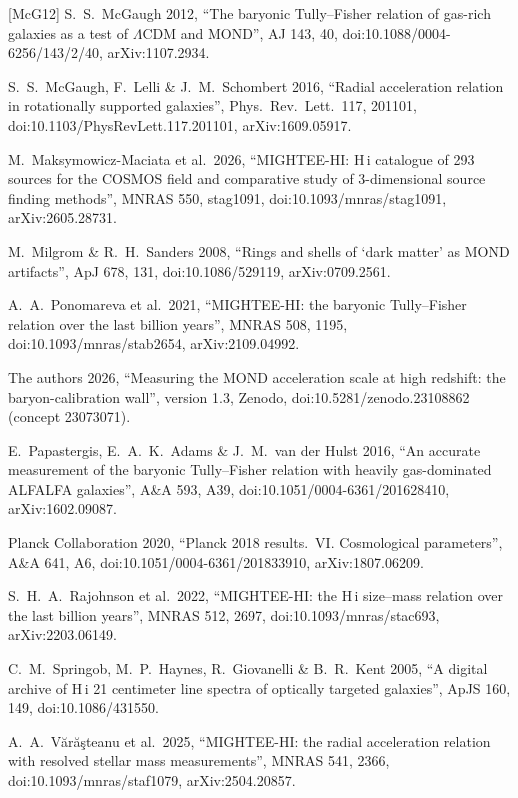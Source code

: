\documentclass[10pt]{article}
\begin{document}
[McG12] S.~S.~McGaugh 2012, ``The baryonic Tully--Fisher relation of gas-rich galaxies as a test of $\Lambda$CDM and MOND'', AJ 143, 40, doi:10.1088/0004-6256/143/2/40, arXiv:1107.2934.\par
[MLS16] S.~S.~McGaugh, F.~Lelli \& J.~M.~Schombert 2016, ``Radial acceleration relation in rotationally supported galaxies'', Phys.\ Rev.\ Lett.\ 117, 201101, doi:10.1103/PhysRevLett.117.201101, arXiv:1609.05917.\par
[MM26] M.~Maksymowicz-Maciata et al.\ 2026, ``MIGHTEE-HI: H\,{\sc i} catalogue of 293 sources for the COSMOS field and comparative study of 3-dimensional source finding methods'', MNRAS 550, stag1091, doi:10.1093/mnras/stag1091, arXiv:2605.28731.\par
[MS08] M.~Milgrom \& R.~H.~Sanders 2008, ``Rings and shells of `dark matter' as MOND artifacts'', ApJ 678, 131, doi:10.1086/529119, arXiv:0709.2561.\par
[P21] A.~A.~Ponomareva et al.\ 2021, ``MIGHTEE-HI: the baryonic Tully--Fisher relation over the last billion years'', MNRAS 508, 1195, doi:10.1093/mnras/stab2654, arXiv:2109.04992.\par
[P38] The authors 2026, ``Measuring the MOND acceleration scale at high redshift: the baryon-calibration wall'', version 1.3, Zenodo, doi:10.5281/zenodo.23108862 (concept 23073071).\par
[PAH16] E.~Papastergis, E.~A.~K.~Adams \& J.~M.~van der Hulst 2016, ``An accurate measurement of the baryonic Tully--Fisher relation with heavily gas-dominated ALFALFA galaxies'', A\&A 593, A39, doi:10.1051/0004-6361/201628410, arXiv:1602.09087.\par
[PL20] Planck Collaboration 2020, ``Planck 2018 results.\ VI. Cosmological parameters'', A\&A 641, A6, doi:10.1051/0004-6361/201833910, arXiv:1807.06209.\par
[R22] S.~H.~A.~Rajohnson et al.\ 2022, ``MIGHTEE-HI: the H\,{\sc i} size--mass relation over the last billion years'', MNRAS 512, 2697, doi:10.1093/mnras/stac693, arXiv:2203.06149.\par
[S05] C.~M.~Springob, M.~P.~Haynes, R.~Giovanelli \& B.~R.~Kent 2005, ``A digital archive of H\,{\sc i} 21 centimeter line spectra of optically targeted galaxies'', ApJS 160, 149, doi:10.1086/431550.\par
[V25] A.~A.~V\u{a}r\u{a}\c{s}teanu et al.\ 2025, ``MIGHTEE-HI: the radial acceleration relation with resolved stellar mass measurements'', MNRAS 541, 2366, doi:10.1093/mnras/staf1079, arXiv:2504.20857.\par
\end{document}
